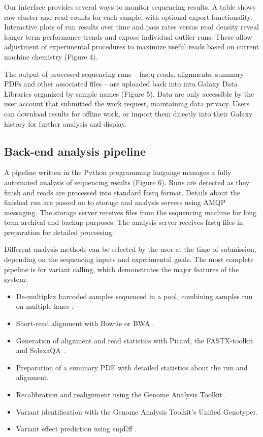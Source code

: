 \documentclass[10pt]{bmc_article}
\newenvironment{bmcformat}{\begin{raggedright}\baselineskip20pt\sloppy\setboolean{publ}{false}}{\end{raggedright}\baselineskip20pt\sloppy}
\begin{document}
\begin{bmcformat}
Our interface provides several ways to monitor sequencing results.
A table shows raw cluster and read counts for each sample, with
optional export functionality.  Interactive plots of run results over
time and pass rates versus read density reveal longer term performance
trends and expose individual outlier runs. These allow adjustment of
experimental procedures to maximize useful reads based on current
machine chemistry (Figure 4).

The output of processed sequencing runs -- fastq reads, alignments,
summary PDFs and other associated files -- are uploaded back
into into Galaxy Data Libraries organized by sample names (Figure
5). Data are only accessible by the user account that submitted the
work request, maintaining data privacy. Users can download results for
offline work, or import them directly into their Galaxy history for
further analysis and display.

\subsection*{Back-end analysis pipeline}

A pipeline written in the Python programming language manages a fully
automated analysis of sequencing results (Figure 6). Runs are detected
as they finish and reads are processed into standard fastq
format. Details about the finished run are passed on to storage and
analysis servers using AMQP messaging. The storage server receives
files from the sequencing machine for long term archival and backup
purposes. The analysis server receives fastq files in preparation for
detailed processing.

Different analysis methods can be selected by the user at the time of
submission, depending on the sequencing inputs and experimental
goals. The most complete pipeline is for variant calling, which
demonstrates the major features of the system:

\begin{itemize}
  \item De-multiplex barcoded samples sequenced in a pool, combining
    samples run on multiple lanes \cite{cock_biopython:_2009}.
  \item Short-read alignment with Bowtie or BWA
    \cite{langmead_ultrafast_2009,li_fast_2009}.
  \item Generation of alignment and read statistics with Picard, the
    FASTX-toolkit and SolexaQA
    \cite{_picard_????,_fastx-toolkit_????,cox_solexaqa:_2010}.
  \item Preparation of a summary PDF with detailed statistics
    about the run and alignment.
  \item Recalibration and realignment using the Genome Analysis
    Toolkit
    \cite{mckenna_genome_2010,_pysam_????,gautier_intuitive_2010}.
  \item Variant identification with the Genome Analysis Toolkit's
    Unified Genotyper.
  \item Variant effect prediction using snpEff \cite{_snpeff_????}.
\end{itemize}


\end{bmcformat}
\end{document}
